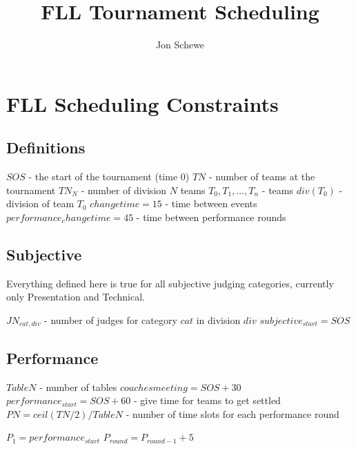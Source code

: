 \documentclass[letterpaper,11pt]{report}
\title{FLL Tournament Scheduling}
\author{Jon Schewe}
\begin{document}
\maketitle

\chapter{FLL Scheduling Constraints}

\section{Definitions}

\begin{algorithmic}
\STATE $SOS$ - the start of the tournament (time 0)
\STATE $TN$ - number of teams at the tournament
\STATE $TN_{N}$ - number of division $N$ teams
\STATE $T_{0}, T_{1}, \dots, T_{n}$ - teams
\STATE $div(T_{0})$ - division of team $T_{0}$
\STATE $changetime = 15$ - time between events
\STATE $performance_changetime = 45$ - time between performance rounds
\end{algorithmic}


\section{Subjective}

Everything defined here is true for all subjective judging categories, currently only Presentation and Technical.

\begin{algorithmic}
\STATE $JN_{cat,div}$ - number of judges for category $cat$ in division $div$
\STATE $subjective_{start} = SOS$
\end{algorithmic}

\section{Performance}
\begin{algorithmic}
\STATE $TableN$ - number of tables
\STATE $coaches meeting = SOS + 30$
\STATE $performance_{start} = SOS + 60$ - give time for teams to get settled
\STATE $PN = ceil(TN / 2) / TableN$ - number of time slots for each performance round
\end{algorithmic}

\begin{algorithmic}
\STATE $P_{1} = performance_{start}$
  \STATE $P_{round} = P_{round-1} + 5$
\ENDFOR
\end{algorithmic}
\end{document}
